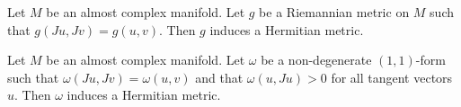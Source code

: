 \documentclass[a4paper]{article}
\begin{document}
\begin{lmm}{}{} Let $M$ be an almost complex manifold. Let $g$ be a Riemannian metric on $M$ such that $g(Ju,Jv)=g(u,v)$. Then $g$ induces a Hermitian metric. 
\end{lmm}

\begin{lmm}{}{} Let $M$ be an almost complex manifold. Let $\omega$ be a non-degenerate $(1,1)$-form such that $\omega(Ju,Jv)=\omega(u,v)$ and that $\omega(u,Ju)>0$ for all tangent vectors $u$. Then $\omega$ induces a Hermitian metric. 
\end{lmm}
\end{document}
